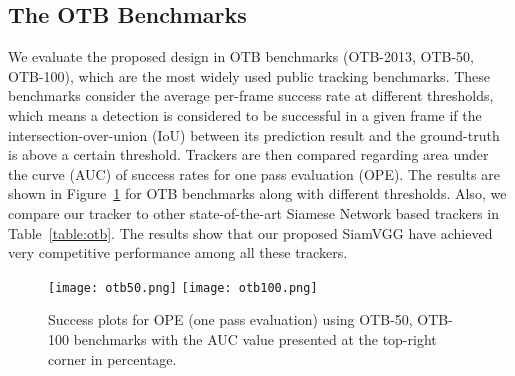 \documentclass[runningheads]{llncs}
\begin{document}
\subsection{The OTB Benchmarks}

We evaluate the proposed design in OTB benchmarks (OTB-2013, OTB-50, OTB-100), which are the most widely used public tracking benchmarks. These benchmarks consider the average per-frame success rate at different thresholds, which means a detection is considered to be successful in a given frame if the intersection-over-union (IoU) between its prediction result and the ground-truth is above a certain threshold. Trackers are then compared regarding area under the curve (AUC) of success rates for one pass evaluation (OPE). The results are shown in Figure~\ref{fig:otb} for OTB benchmarks along with different thresholds. Also, we compare our tracker to other state-of-the-art Siamese Network based trackers in Table~\ref{table:otb}. The results show that our proposed SiamVGG have achieved very competitive performance among all these trackers.


\begin{figure}
\centering
\texttt{[image: otb50.png]}\hfill
\texttt{[image: otb100.png]}

\caption{Success plots for OPE (one pass evaluation) using OTB-50, OTB-100 benchmarks with the AUC value presented at the top-right corner in percentage.}

\label{fig:otb}
\end{figure}
\end{document}
